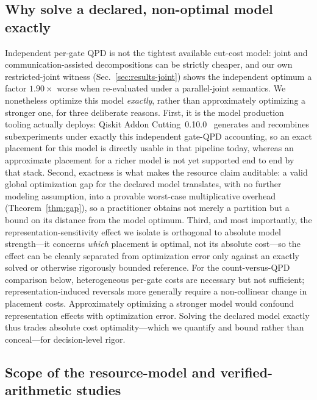 \documentclass[
  aps,
  pra,
  reprint,
  amsmath,
  amssymb,
  longbibliography,
  nofootinbib,
  floatfix
]{revtex4-2}
\theoremstyle{plain}
\begin{document}
\subsection{Why solve a declared, non-optimal model exactly}
\label{sec:why-exact}

Independent per-gate QPD is not the tightest available cut-cost model: joint and communication-assisted decompositions can be strictly cheaper, and our own restricted-joint witness (Sec.~\ref{sec:results-joint}) shows the independent optimum a factor $1.90\times$ worse when re-evaluated under a parallel-joint semantics. We nonetheless optimize this model \emph{exactly}, rather than approximately optimizing a stronger one, for three deliberate reasons. First, it is the model production tooling actually deploys: Qiskit Addon Cutting~0.10.0~\cite{qiskitcutting} generates and recombines subexperiments under exactly this independent gate-QPD accounting, so an exact placement for this model is directly usable in that pipeline today, whereas an approximate placement for a richer model is not yet supported end to end by that stack. Second, exactness is what makes the resource claim auditable: a valid global optimization gap for the declared model translates, with no further modeling assumption, into a provable worst-case multiplicative overhead (Theorem~\ref{thm:gap}), so a practitioner obtains not merely a partition but a bound on its distance from the model optimum. Third, and most importantly, the representation-sensitivity effect we isolate is orthogonal to absolute model strength---it concerns \emph{which} placement is optimal, not its absolute cost---so the effect can be cleanly separated from optimization error only against an exactly solved or otherwise rigorously bounded reference. For the count-versus-QPD comparison below, heterogeneous per-gate costs are necessary but not sufficient; representation-induced reversals more generally require a non-collinear change in placement costs. Approximately optimizing a stronger model would confound representation effects with optimization error. Solving the declared model exactly thus trades absolute cost optimality---which we quantify and bound rather than conceal---for decision-level rigor.

\subsection{Scope of the resource-model and verified-arithmetic studies}
\label{sec:scope-preview}
\end{document}
